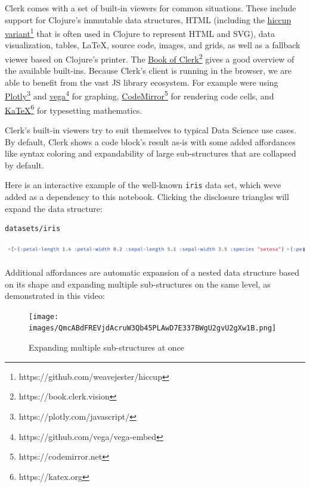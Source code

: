 \documentclass[sigconf,screen]{acmart}
\newcommand{\passthrough}[1]{#1}
\begin{document}
Clerk comes with a set of built-in viewers for common situations. These include support for Clojure's immutable data structures, HTML (including the {\href{https://github.com/weavejester/hiccup}{hiccup variant}\footnote{https://github.com/weavejester/hiccup}} that is often used in Clojure to represent HTML and SVG), data visualization, tables, LaTeX, source code, images, and grids, as well as a fallback viewer based on Clojure's printer. The {\href{https://book.clerk.vision}{Book of Clerk}\footnote{https://book.clerk.vision}} gives a good overview of the available built-ins. Because Clerk's client is running in the browser, we are able to benefit from the vast JS library ecosystem. For example we\textquotesingle re using {\href{https://plotly.com/javascript/}{Plotly}\footnote{https://plotly.com/javascript/}} and {\href{https://github.com/vega/vega-embed}{vega}\footnote{https://github.com/vega/vega-embed}} for graphing, {\href{https://codemirror.net}{CodeMirror}\footnote{https://codemirror.net}} for rendering code cells, and {\href{https://katex.org}{KaTeX}\footnote{https://katex.org}} for typesetting mathematics.

Clerk's built-in viewers try to suit themselves to typical Data Science use cases. By default, Clerk shows a code block's result as-is with some added affordances like syntax coloring and expandability of large sub-structures that are collapsed by default.

Here is an interactive example of the well-known \passthrough{\lstinline!iris!} data set, which we\textquotesingle ve added as a dependency to this notebook. Clicking the disclosure triangles will expand the data structure:

\begin{minipage}{\linewidth}
\begin{lstlisting}
datasets/iris
\end{lstlisting}
\end{minipage}

\includegraphics{images/anon-expr-5dtc44qrw3zUvpTfiAXJDH7mtADdRT-result.png}

Additional affordances are automatic expansion of a nested data structure based on its shape and expanding multiple sub-structures on the same level, as demonstrated in this video:

\begin{figure}
\hypertarget{expanding-multiple-sub-structures-at-once}{%
\centering
\texttt{[image: images/QmcABdFREVjdAcruW3Qb45PLAwD7E337BWgU2gvU2gXw1B.png]}
\caption{Expanding multiple sub-structures at once}\label{expanding-multiple-sub-structures-at-once}
}
\end{figure}
\end{document}
